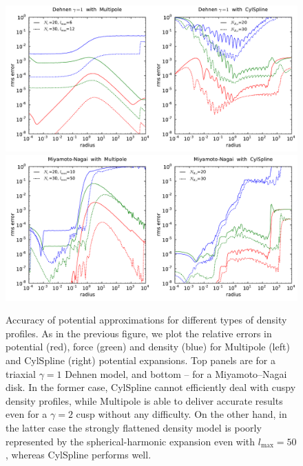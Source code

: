 \documentclass[12pt]{article}
\begin{document}
\begin{figure}
\includegraphics[width=16cm]{D1.pdf}
\includegraphics[width=16cm]{MN.pdf}
\caption{Accuracy of potential approximations for different types of density profiles. As in the previous figure, we plot the relative errors in potential (red), force (green) and density (blue) for Multipole (left) and CylSpline (right) potential expansions. Top panels are for a triaxial $\gamma=1$ Dehnen model, and bottom -- for a Miyamoto--Nagai disk. In the former case, CylSpline cannot efficiently deal with cuspy density profiles, while Multipole is able to deliver accurate results even for a $\gamma=2$ cusp without any difficulty. On the other hand, in the latter case the strongly flattened density model is poorly represented by the spherical-harmonic expansion even with $l_\mathrm{max}=50$, whereas CylSpline performs well.
}  \label{fig:PotentialAccuracy2}
\end{figure}
\end{document}
